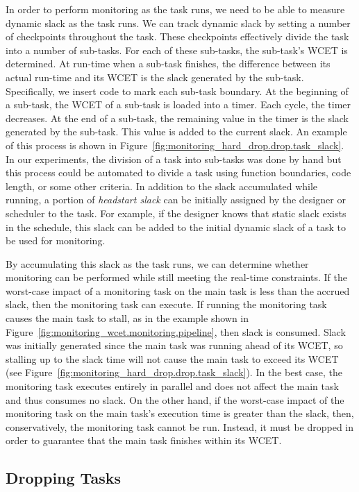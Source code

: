 In order to perform monitoring as the task runs, we need to be able to measure
dynamic slack as the task runs.  We can track dynamic slack by setting a number
of checkpoints throughout the task.  These checkpoints effectively divide the
task into a number of sub-tasks.  For each of these sub-tasks, the sub-task's
WCET is determined.  At run-time when a sub-task finishes, the difference
between its actual run-time and its WCET is the slack generated by the
sub-task.  Specifically, we insert code to mark each sub-task boundary.  At the
beginning of a sub-task, the WCET of a sub-task is loaded into a timer. Each
cycle, the timer decreases. At the end of a sub-task, the remaining value in
the timer is the slack generated by the sub-task. This value is added to the
current slack.  An example of this process is shown in
Figure~\ref{fig:monitoring_hard_drop.drop.task_slack}. In our experiments, the
division of a task into sub-tasks was done by hand but this process could be
automated to divide a task using function boundaries, code length, or some
other criteria.  In addition to the slack accumulated while running, a portion
of \emph{headstart slack} can be initially assigned by the designer or
scheduler to the task. For example, if the designer knows that static slack
exists in the schedule, this slack can be added to the initial dynamic slack of
a task to be used for monitoring.

By accumulating this slack as the task runs, we can determine whether
monitoring can be performed while still meeting the real-time constraints. If
the worst-case impact of a monitoring task on the main task is less than the
accrued slack, then the monitoring task can execute.  If running the monitoring
task causes the main task to stall, as in the example shown in
Figure~\ref{fig:monitoring_wcet.monitoring.pipeline}, then slack is consumed.
Slack was initially generated since the main task was running ahead of its
WCET, so stalling up to the slack time will not cause the main task to exceed
its WCET (see Figure~\ref{fig:monitoring_hard_drop.drop.task_slack}). In the
best case, the monitoring task executes entirely in parallel and does not
affect the main task and thus consumes no slack. On the other hand, if the
worst-case impact of the monitoring task on the main task's execution time is
greater than the slack, then, conservatively, the monitoring task cannot be
run. Instead, it must be dropped in order to guarantee that the main task
finishes within its WCET.

\subsection{Dropping Tasks}
\label{sec:monitoring_hard_drop.drop.dropping_tasks}

